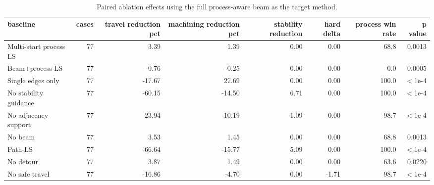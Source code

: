 \begin{table}[t]
\centering
\caption{Paired ablation effects using the full process-aware beam as the target method.}
\label{tab:ablation-paired-comparison}
\begin{tabular}{lrrrrrrr}
\toprule
baseline & cases & travel reduction pct & machining reduction pct & stability reduction & hard delta & process win rate & p value \\
\midrule
Multi-start process LS & 77 & 3.39 & 1.39 & 0.00 & 0.00 & 68.8 & 0.0013 \\
Beam+process LS & 77 & -0.76 & -0.25 & 0.00 & 0.00 & 0.0 & 0.0005 \\
Single edges only & 77 & -17.67 & 27.69 & 0.00 & 0.00 & 100.0 & $<$1e-4 \\
No stability guidance & 77 & -60.15 & -14.50 & 6.71 & 0.00 & 100.0 & $<$1e-4 \\
No adjacency support & 77 & 23.94 & 10.19 & 1.09 & 0.00 & 98.7 & $<$1e-4 \\
No beam & 77 & 3.53 & 1.45 & 0.00 & 0.00 & 68.8 & 0.0013 \\
Path-LS & 77 & -66.64 & -15.77 & 5.09 & 0.00 & 100.0 & $<$1e-4 \\
No detour & 77 & 3.87 & 1.49 & 0.00 & 0.00 & 63.6 & 0.0220 \\
No safe travel & 77 & -16.86 & -4.70 & 0.00 & -1.71 & 98.7 & $<$1e-4 \\
\bottomrule
\end{tabular}
\end{table}
